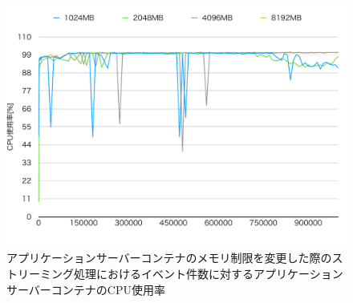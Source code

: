 \documentclass[../../../../../main]{subfiles}
\begin{document}
    \begin{figure}[H]
        \centering
        \includegraphics[width=12cm]{graph}
        \caption{アプリケーションサーバーコンテナのメモリ制限を変更した際のストリーミング処理におけるイベント件数に対するアプリケーションサーバーコンテナのCPU使用率}
        \label{fig:stream-change-app-memory-limit-app-cpu-app_4_db_1_1024}
    \end{figure}
\end{document}
